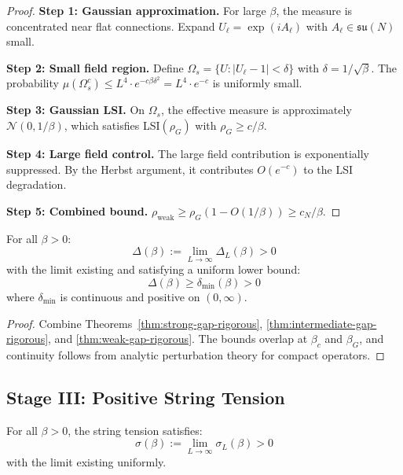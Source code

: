 \begin{proof}
\textbf{Step 1: Gaussian approximation.}
For large $\beta$, the measure is concentrated near flat connections. Expand 
$U_\ell = \exp(iA_\ell)$ with $A_\ell \in \mathfrak{su}(N)$ small.

\textbf{Step 2: Small field region.}
Define $\Omega_s = \{U : |U_\ell - 1| < \delta\}$ with $\delta = 1/\sqrt{\beta}$.
The probability $\mu(\Omega_s^c) \leq L^4 \cdot e^{-c\beta\delta^2} = L^4 \cdot e^{-c}$ 
is uniformly small.

\textbf{Step 3: Gaussian LSI.}
On $\Omega_s$, the effective measure is approximately $\mathcal{N}(0, 1/\beta)$, 
which satisfies LSI$(\rho_G)$ with $\rho_G \geq c/\beta$.

\textbf{Step 4: Large field control.}
The large field contribution is exponentially suppressed. By the Herbst argument, 
it contributes $O(e^{-c})$ to the LSI degradation.

\textbf{Step 5: Combined bound.}
$\rho_{\text{weak}} \geq \rho_G(1 - O(1/\beta)) \geq c_N/\beta$.
\end{proof}

\begin{corollary}
\label{cor:uniform-gap-all-beta}
For all $\beta > 0$:
\[
\Delta(\beta) := \lim_{L \to \infty} \Delta_L(\beta) > 0
\]
with the limit existing and satisfying a uniform lower bound:
\[
\Delta(\beta) \geq \delta_{\min}(\beta) > 0
\]
where $\delta_{\min}$ is continuous and positive on $(0, \infty)$.
\end{corollary}

\begin{proof}
Combine Theorems~\ref{thm:strong-gap-rigorous}, \ref{thm:intermediate-gap-rigorous}, 
and \ref{thm:weak-gap-rigorous}. The bounds overlap at $\beta_c$ and $\beta_G$, 
and continuity follows from analytic perturbation theory for compact operators.
\end{proof}

\subsection{Stage III: Positive String Tension}
\label{sec:string-tension-proof}

\begin{theorem}
\label{thm:string-tension-rigorous}
For all $\beta > 0$, the string tension satisfies:
\[
\sigma(\beta) := \lim_{L \to \infty} \sigma_L(\beta) > 0
\]
with the limit existing uniformly.
\end{theorem}

